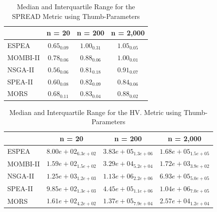 \begin{table}[!htc]
\centering
\begin{tabular}{@{}lccc@{}}
\toprule
         & n = 20                          & n = 200                         & n = 2,000         \\ \midrule
ESPEA    & $0.65_{0.09}$                   & $1.00_{0.31}$                   & $1.05_{0.05}$                   \\
MOMBI-II & $0.78_{0.06}$                   & $0.88_{0.06}$                   & $1.00_{0.01}$                   \\
NSGA-II  & \cellcolor{gray95}$0.56_{0.06}$ & \cellcolor{gray95}$0.81_{0.18}$ & $0.91_{0.07}$                   \\
SPEA-II  & \cellcolor{gray25}$0.60_{0.08}$ & \cellcolor{gray25}$0.82_{0.09}$ & \cellcolor{gray95}$0.84_{0.06}$ \\
MORS     & $0.68_{0.11}$                   & $0.83_{0.04}$                   & \cellcolor{gray25}$0.88_{0.02}$ \\ \bottomrule
\end{tabular}%
\caption{Median and Interquartile Range for the SPREAD Metric using Thumb-Parameters}
\label{tab:spread_thumb}
\end{table}

\begin{table}[!htc]
\centering
\begin{tabular}{@{}lccc@{}}
\toprule
         & n = 20                                    & n = 200                                   & n = 2,000                                 \\ \midrule
ESPEA    & $  8.00e+02_{ 6.3e+02}$                   & $  3.83e+05_{ 1.3e+06}$                   & $  1.68e+05_{ 1.5e+05}$                   \\
MOMBI-II & $  1.59e+02_{ 1.5e+02}$                   & $  3.29e+04_{ 5.2e+04}$                   & $  1.72e+03_{ 3.9e+02}$                   \\
NSGA-II  & \cellcolor{gray95}$  1.25e+03_{ 1.2e+03}$ & \cellcolor{gray95}$  1.13e+06_{ 2.2e+06}$ & \cellcolor{gray25}$  6.93e+05_{ 5.0e+05}$ \\
SPEA-II  & \cellcolor{gray25}$  9.85e+02_{ 1.3e+03}$ & \cellcolor{gray25}$  4.45e+05_{ 1.1e+06}$ & \cellcolor{gray95}$  1.04e+06_{ 7.0e+05}$ \\
MORS     & $  1.61e+02_{ 4.2e+02}$                   & $  1.37e+05_{ 7.9e+04}$                   & $  2.57e+04_{ 1.2e+04}$                   \\ \bottomrule
\end{tabular}%
\caption{Median and Interquartile Range for the HV. Metric using Thumb-Parameters}
\label{tab:hv_thumb}
\end{table}

